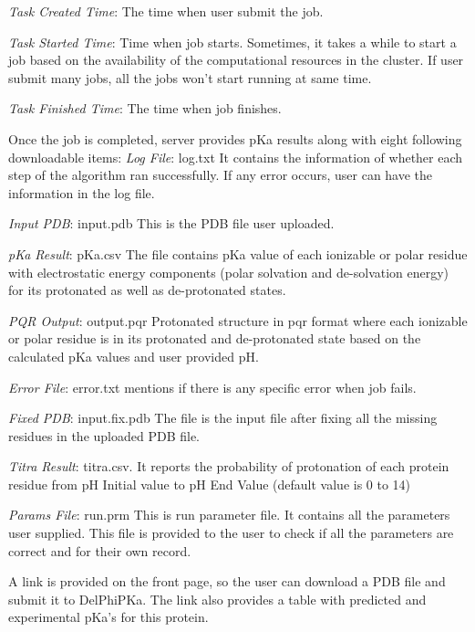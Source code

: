 \documentclass[9pt,tutorial]{livecoms}
\begin{document}
\textit{Task Created Time}: The time when user submit the job.

\textit{Task Started Time}: Time when job starts. Sometimes, it takes a while to start a job based on the availability of the computational resources in the cluster. If user submit many jobs, all the jobs won’t start running at same time.

\textit{Task Finished Time}: The time when job finishes.

Once the job is completed, server provides pKa results along with eight following downloadable items:
\textit{Log File}: log.txt It contains the information of whether each step of the algorithm ran successfully. If any error occurs, user can have the information in the log file.

\textit{Input PDB}: input.pdb This is the PDB file user uploaded.

\textit{pKa Result}: pKa.csv The file contains pKa value of each ionizable or polar residue with electrostatic energy components (polar solvation and de-solvation energy) for its protonated as well as de-protonated states.

\textit{PQR Output}: output.pqr Protonated structure in pqr format where each ionizable or polar residue is in its protonated and de-protonated state based on the calculated pKa values and user provided pH.

\textit{Error File}: error.txt mentions if there is any specific error when job fails.

\textit{Fixed PDB}: input.fix.pdb The file is the input file after fixing all the missing residues in the uploaded PDB file.

\textit{Titra Result}: titra.csv.   It reports the probability of protonation of each protein residue from pH Initial value to pH End Value (default value is 0 to 14)

\textit{Params File}: run.prm This is run parameter file. It contains all the parameters user supplied. This file is provided to the user to check if all the parameters are correct and for their own record. 

A link is provided on the front page, so the user can download a PDB file and submit it to DelPhiPKa. The link also provides a table with predicted and experimental pKa's for this protein.
\end{document}

